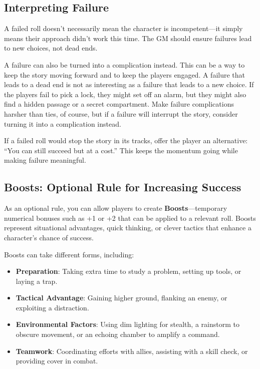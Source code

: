 \begin{multicols}{2}
\subsection{Interpreting Failure}
A failed roll doesn’t necessarily mean the character is incompetent—it simply means their approach didn’t work this time. The GM should ensure failures lead to new choices, not dead ends.

A failure can also be turned into a complication instead. This can be a way to keep the story moving forward and to keep the players engaged. A failure that leads to a dead end is not as interesting as a failure that leads to a new choice. If the players fail to pick a lock, they might set off an alarm, but they might also find a hidden passage or a secret compartment. Make failure complications harsher than ties, of course, but if a failure will interrupt the story, consider turning it into a complication instead.

\begin{GmTips}
    If a failed roll would stop the story in its tracks, offer the player an alternative: “You can still succeed but at a cost.” This keeps the momentum going while making failure meaningful.
\end{GmTips}

\subsection{Boosts: Optional Rule for Increasing Success}

As an optional rule, you can allow players to create \textbf{Boosts}—temporary numerical bonuses such as +1 or +2 that can be applied to a relevant roll. Boosts represent situational advantages, quick thinking, or clever tactics that enhance a character’s chance of success.  

Boosts can take different forms, including:  

\begin{itemize}
    \item \textbf{Preparation}: Taking extra time to study a problem, setting up tools, or laying a trap.  
    \item \textbf{Tactical Advantage}: Gaining higher ground, flanking an enemy, or exploiting a distraction.  
    \item \textbf{Environmental Factors}: Using dim lighting for stealth, a rainstorm to obscure movement, or an echoing chamber to amplify a command.  
    \item \textbf{Teamwork}: Coordinating efforts with allies, assisting with a skill check, or providing cover in combat.  
\end{itemize}


\end{multicols}
